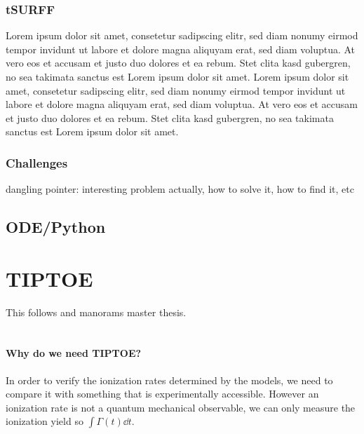 \subsubsection{tSURFF}
Lorem ipsum dolor sit amet, consetetur sadipscing elitr, sed diam nonumy eirmod tempor invidunt ut labore et dolore magna aliquyam erat, sed diam voluptua. At vero eos et accusam et justo duo dolores et ea rebum. Stet clita kasd gubergren, no sea takimata sanctus est Lorem ipsum dolor sit amet. Lorem ipsum dolor sit amet, consetetur sadipscing elitr, sed diam nonumy eirmod tempor invidunt ut labore et dolore magna aliquyam erat, sed diam voluptua. At vero eos et accusam et justo duo dolores et ea rebum. Stet clita kasd gubergren, no sea takimata sanctus est Lorem ipsum dolor sit amet.
\subsubsection{Challenges}
dangling pointer: interesting problem actually, how to solve it, how to find it, etc




\subsection{ODE/Python}




\section{TIPTOE}
This follows \cite{Park:18} and manorams master thesis.\\\\
\paragraph{Why do we need TIPTOE?} 
In order to verify the ionization rates determined by the models, we need to compare it with something that is experimentally accessible.
However an ionization rate is not a quantum mechanical observable, we can only measure the ionization yield so $\int \Gamma(t) \dd t$.

